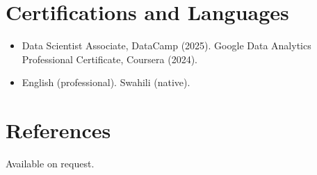 \documentclass[10pt,a4paper]{article}
\begin{document}
\section{Certifications and Languages}
\begin{itemize}
  \item Data Scientist Associate, DataCamp (2025). Google Data Analytics Professional Certificate, Coursera (2024).
  \item English (professional). Swahili (native).
\end{itemize}

\section{References}
Available on request.
\end{document}
